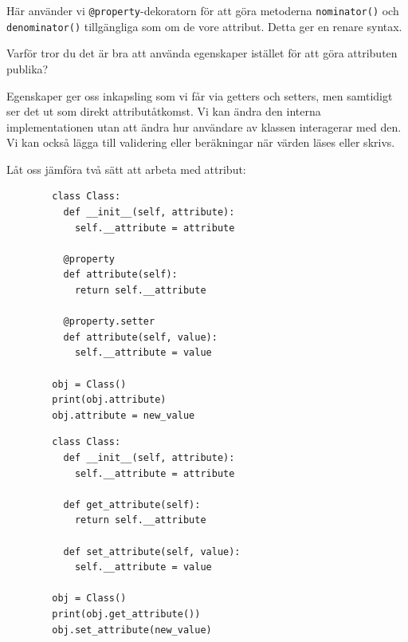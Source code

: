 Här använder vi \texttt{@property}-dekoratorn för att göra 
metoderna \texttt{nominator()} och \texttt{denominator()} 
tillgängliga som om de vore attribut. Detta ger en renare syntax.

\begin{exercise}
  Varför tror du det är bra att använda egenskaper istället för att göra 
  attributen publika?
\end{exercise}

Egenskaper ger oss inkapsling som vi får via getters och setters, men samtidigt 
ser det ut som direkt attributåtkomst.
Vi kan ändra den interna implementationen utan att ändra hur användare av 
klassen interagerar med den.
Vi kan också lägga till validering eller beräkningar när värden läses eller 
skrivs.

Låt oss jämföra två sätt att arbeta med attribut:

\begin{frame}[fragile]
  \begin{flushleft}
  \begin{minipage}[t]{0.49\linewidth}
    \begin{verbatim}
        class Class:
          def __init__(self, attribute):
            self.__attribute = attribute

          @property
          def attribute(self):
            return self.__attribute

          @property.setter
          def attribute(self, value):
            self.__attribute = value

        obj = Class()
        print(obj.attribute)
        obj.attribute = new_value
    \end{verbatim}
  \end{minipage}\hfill
  \begin{minipage}[t]{0.49\linewidth}
    \begin{verbatim}
        class Class:
          def __init__(self, attribute):
            self.__attribute = attribute

          def get_attribute(self):
            return self.__attribute

          def set_attribute(self, value):
            self.__attribute = value

        obj = Class()
        print(obj.get_attribute())
        obj.set_attribute(new_value)
    \end{verbatim}
  \end{minipage}
  \end{flushleft}
\end{frame}


